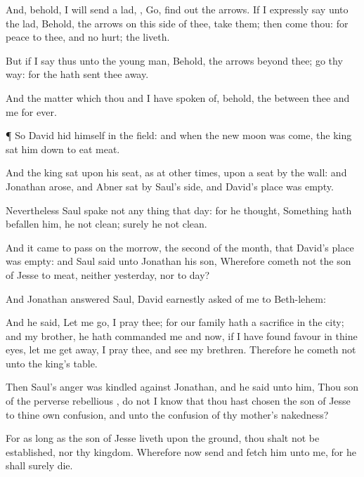 {And, behold, I will
send a
lad,
{},
Go, find
out the
arrows. If I
expressly
say unto the
lad, Behold, the
arrows
{} on this side of thee,
take them; then
come thou: for
{}
peace to thee, and no
hurt;
{} the
{}
liveth.

But if I
say thus unto the young
man, Behold, the
arrows
{}
beyond thee; go thy
way: for the
{} hath sent thee
away.

And
{} the
matter which thou and I have
spoken of, behold, the
{}
{} between thee and me
for
ever.


\par }{\PP {}¶ So
David
hid himself in the
field: and when the new
moon was come, the
king sat him
down to
eat
meat.

And the
king
sat upon his
seat, as at other
times,
{} upon a
seat by the
wall: and
Jonathan
arose, and
Abner
sat by
Saul’s
side, and
David’s
place was
empty.

Nevertheless
Saul
spake not any
thing that
day: for he
thought, Something hath
befallen him, he
{}
not
clean; surely he
{} not
clean.

And it came to pass on the
morrow,
{} the
second
{} of the
month, that
David’s
place was
empty: and
Saul
said unto
Jonathan his
son, Wherefore
cometh not the
son of
Jesse to
meat, neither
yesterday, nor to
day?

And
Jonathan
answered
Saul,
David
earnestly
asked
{} of
me
{} to
Beth-lehem:

And he
said, Let me
go, I pray thee; for our
family hath a
sacrifice in the
city; and my
brother, he hath
commanded me
{} and now, if I have
found
favour in thine
eyes, let me get
away, I pray thee, and
see my
brethren. Therefore he
cometh not unto the
king’s
table.

Then
Saul’s
anger was
kindled against
Jonathan, and he
said unto him, Thou
son of the
perverse
rebellious
{}, do not I
know that thou hast
chosen the
son of
Jesse to thine own
confusion, and unto the
confusion of thy
mother’s
nakedness?

For as long
as the
son of
Jesse
liveth upon the
ground, thou shalt not be
established, nor thy
kingdom. Wherefore now
send and
fetch him unto me, for he shall surely
die.

}
